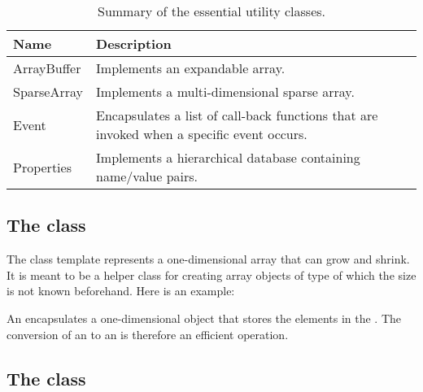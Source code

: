 \begin{table}

  \caption{Summary of the essential utility classes.}
  \label{table:jem-util}

  \begin{center}

    \begin{tabular}{|>{\ttfamily}lp{10cm}|}
      \hline
      Name        & Description \\
      \hline \hline
      ArrayBuffer & Implements an expandable array. \\
      SparseArray & Implements a multi-dimensional sparse array. \\
      Event       & Encapsulates a list of call-back functions
                    that are invoked when a specific event occurs. \\
      Properties  & Implements a hierarchical database containing
                    name/value pairs. \\
      \hline
    \end{tabular}

  \end{center}

\end{table}


\subsection*{The  class}

The class template  represents a one-dimensional array
that can grow and shrink. It is meant to be a helper class for creating
array objects of type  of which the size is not known
beforehand. Here is an example:


An  encapsulates a one-dimensional  object
that stores the elements in the . The conversion of an
 to an  is therefore an efficient
operation.


\subsection*{The  class}

